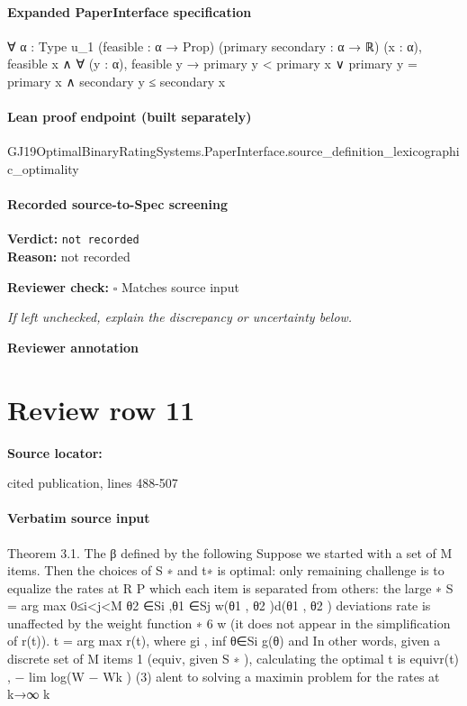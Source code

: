 \documentclass[10pt]{article}
\newcommand{\reviewerbox}{%
  \par\noindent\fbox{\parbox{0.96\linewidth}{\rule{0pt}{0.38in}}}\par
}
\newcommand{\reviewmatch}[1]{%
  \par\noindent\textbf{Reviewer check:} $\square$\; #1\par
  \noindent\emph{If left unchecked, explain the discrepancy or uncertainty below.}\par
}
\begin{document}
\paragraph{Expanded PaperInterface specification}
\begin{ReviewVerbatim}
∀ {α : Type u_1} (feasible : α → Prop) (primary secondary : α → ℝ) (x : α),
  feasible x ∧ ∀ (y : α), feasible y → primary y < primary x ∨ primary y = primary x ∧ secondary y ≤ secondary x
\end{ReviewVerbatim}

\paragraph{Lean proof endpoint (built separately)}\begin{ReviewVerbatim}
GJ19OptimalBinaryRatingSystems.PaperInterface.source_definition_lexicographic_optimality
\end{ReviewVerbatim}

\paragraph{Recorded source-to-Spec screening}
\textbf{Verdict:} \texttt{not recorded}
\\
\textbf{Reason:} not recorded
\reviewmatch{Matches source input}
\noindent\textbf{Reviewer annotation}\par
\reviewerbox
\clearpage
\hypertarget{source-claim-84eec684fc1865ab}{}
\section*{Review row 11}
\textbf{Source locator:} {\footnotesize\raggedright cited publication, lines 488-\allowbreak{}507\par}
\paragraph{Verbatim source input}
\begin{ReviewVerbatim}
Theorem 3.1. The β defined by the following
Suppose we started with a set of M items. Then the
choices of S ∗ and t∗ is optimal:
only remaining challenge is to equalize the rates at
R
P
which each item is separated from others: the large
∗
S = arg max 0≤i<j<M θ2 ∈Si ,θ1 ∈Sj w(θ1 , θ2 )d(θ1 , θ2 )
deviations rate is unaffected by the weight function
∗
6
w (it does not appear in the simplification of r(t)).
t = arg max r(t), where gi , inf θ∈Si g(θ) and
In other words, given a discrete set of M items
1
(equiv, given S ∗ ), calculating the optimal t is equivr(t) , − lim log(W − Wk )
(3)
alent to solving a maximin problem for the rates at
k→∞ k
\end{ReviewVerbatim}
\end{document}
